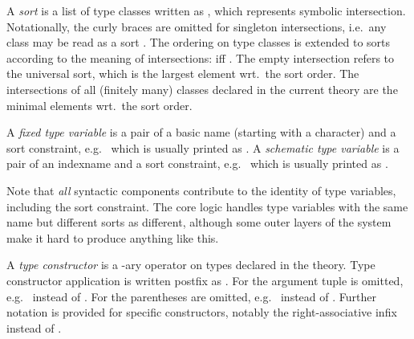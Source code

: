 \begin{isabellebody}
\begin{isamarkuptext}
  A \emph{sort} is a list of type classes written as , which represents symbolic
  intersection.  Notationally, the curly braces are omitted for
  singleton intersections, i.e.\ any class  may be read as
  a sort .  The ordering on type classes is extended to
  sorts according to the meaning of intersections:  iff
  .  The empty intersection
  \isa{{\isacharbraceleft}{\isacharbraceright}} refers to the universal sort, which is the largest
  element wrt.\ the sort order.  The intersections of all (finitely
  many) classes declared in the current theory are the minimal
  elements wrt.\ the sort order.

  \medskip A \emph{fixed type variable} is a pair of a basic name
  (starting with a \isa{{\isacharprime}} character) and a sort constraint, e.g.\
   which is usually printed as .
  A \emph{schematic type variable} is a pair of an indexname and a
  sort constraint, e.g.\  which is usually
  printed as \isa{{\isacharquery}{\isasymalpha}\isactrlisub s}.

  Note that \emph{all} syntactic components contribute to the identity
  of type variables, including the sort constraint.  The core logic
  handles type variables with the same name but different sorts as
  different, although some outer layers of the system make it hard to
  produce anything like this.

  A \emph{type constructor} \isa{{\isasymkappa}} is a -ary operator
  on types declared in the theory.  Type constructor application is
  written postfix as .  For
  \isa{k\ {\isacharequal}\ {\isadigit{0}}} the argument tuple is omitted, e.g.\ \isa{prop}
  instead of \isa{{\isacharparenleft}{\isacharparenright}prop}.  For  the parentheses
  are omitted, e.g.\ \isa{{\isasymalpha}\ list} instead of \isa{{\isacharparenleft}{\isasymalpha}{\isacharparenright}list}.
  Further notation is provided for specific constructors, notably the
  right-associative infix \isa{{\isasymalpha}\ {\isasymRightarrow}\ {\isasymbeta}} instead of .
  

\end{isamarkuptext}
\end{isabellebody}
